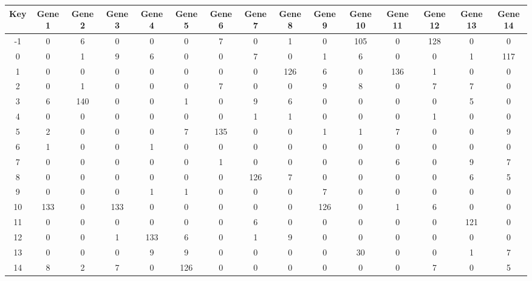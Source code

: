 \begin{tabular}{|c|c|c|c|c|c|c|c|c|c|c|c|c|c|c|}
\hline
Key & Gene 1 & Gene 2 & Gene 3 & Gene 4 & Gene 5 & Gene 6 & Gene 7 & Gene 8 & Gene 9 & Gene 10 & Gene 11 & Gene 12 & Gene 13 & Gene 14 \\
\hline
-1 & 0 & 6 & 0 & 0 & 0 & 7 & 0 & 1 & 0 & 105 & 0 & 128 & 0 & 0 \\
0 & 0 & 1 & 9 & 6 & 0 & 0 & 7 & 0 & 1 & 6 & 0 & 0 & 1 & 117 \\
1 & 0 & 0 & 0 & 0 & 0 & 0 & 0 & 126 & 6 & 0 & 136 & 1 & 0 & 0 \\
2 & 0 & 1 & 0 & 0 & 0 & 7 & 0 & 0 & 9 & 8 & 0 & 7 & 7 & 0 \\
3 & 6 & 140 & 0 & 0 & 1 & 0 & 9 & 6 & 0 & 0 & 0 & 0 & 5 & 0 \\
4 & 0 & 0 & 0 & 0 & 0 & 0 & 1 & 1 & 0 & 0 & 0 & 1 & 0 & 0 \\
5 & 2 & 0 & 0 & 0 & 7 & 135 & 0 & 0 & 1 & 1 & 7 & 0 & 0 & 9 \\
6 & 1 & 0 & 0 & 1 & 0 & 0 & 0 & 0 & 0 & 0 & 0 & 0 & 0 & 0 \\
7 & 0 & 0 & 0 & 0 & 0 & 1 & 0 & 0 & 0 & 0 & 6 & 0 & 9 & 7 \\
8 & 0 & 0 & 0 & 0 & 0 & 0 & 126 & 7 & 0 & 0 & 0 & 0 & 6 & 5 \\
9 & 0 & 0 & 0 & 1 & 1 & 0 & 0 & 0 & 7 & 0 & 0 & 0 & 0 & 0 \\
10 & 133 & 0 & 133 & 0 & 0 & 0 & 0 & 0 & 126 & 0 & 1 & 6 & 0 & 0 \\
11 & 0 & 0 & 0 & 0 & 0 & 0 & 6 & 0 & 0 & 0 & 0 & 0 & 121 & 0 \\
12 & 0 & 0 & 1 & 133 & 6 & 0 & 1 & 9 & 0 & 0 & 0 & 0 & 0 & 0 \\
13 & 0 & 0 & 0 & 9 & 9 & 0 & 0 & 0 & 0 & 30 & 0 & 0 & 1 & 7 \\
14 & 8 & 2 & 7 & 0 & 126 & 0 & 0 & 0 & 0 & 0 & 0 & 7 & 0 & 5 \\
\hline
\end{tabular}